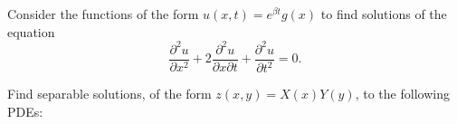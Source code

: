 \documentclass[answers]{exam}
\newcommand*{\bump}{\vspace{1em}\phantom{}\vspace{-1.75em}}
\begin{document}
\begin{questions}
\begin{parts}
\part%
\bump \[
	\dfrac{\partial u}{\partial x}=2 x y u.
\]
\end{parts}



\question%
Consider the functions of the form $u(x, t)=e^{\beta t} g(x)$ to find solutions of the equation \[
	\frac{\partial^2u}{\partial x^2}+2\frac{\partial^2u}{\partial x\partial t}+\frac{\partial^2u}{\partial t^2}=0.
\]



\question%
Find separable solutions, of the form $z(x, y)=X(x) Y(y)$, to the following PDEs:
\begin{parts}
\part%
\bump \[
	\frac{\partial z}{\partial y}=y \frac{\partial z}{\partial x};
\]

\part%
\bump \[
	x \frac{\partial z}{\partial x}=z+y \frac{\partial z}{\partial y}.
\]
\end{parts}

\end{questions}
\end{document}
